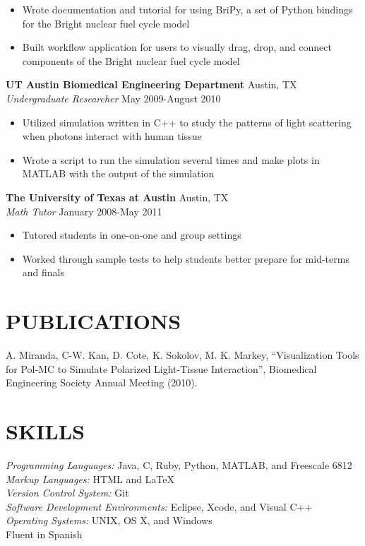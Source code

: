 \documentclass[line,margin]{res}
\begin{document}
\begin{resume}
\begin{itemize}
    \item Wrote documentation and tutorial for using BriPy, a set of Python
    bindings for the Bright nuclear fuel cycle model
    \item Built workflow application for users to visually drag, drop, and 
    connect components of the Bright nuclear fuel cycle model
  \end{itemize}
  {\bf UT Austin Biomedical Engineering Department} \hfill Austin, TX \\
  \emph{Undergraduate Researcher} \hfill May 2009-August 2010
  \begin{itemize} \itemsep -2pt
    \item Utilized simulation written in C++ to study the patterns of light 
    scattering when photons interact with human tissue
    \item Wrote a script to run the simulation several times and make plots in 
    MATLAB with the output of the simulation
  \end{itemize}
  {\bf The University of Texas at Austin} \hfill Austin, TX \\
  \emph{Math Tutor} \hfill January 2008-May 2011
  \begin{itemize} \itemsep -2pt
    \item Tutored students in one-on-one and group settings
    \item Worked through sample tests to help students better prepare for 
    mid-terms and finals
  \end{itemize}
 
\section{PUBLICATIONS} 
  A. Miranda, C-W. Kan, D. Cote, K. Sokolov, M. K. Markey, ``Visualization 
  Tools for Pol-MC to Simulate Polarized Light-Tissue Interaction'', 
  Biomedical Engineering Society Annual Meeting (2010).

\section{SKILLS}
  \emph{Programming Languages:} Java, C, Ruby, Python, MATLAB, and Freescale 
  6812 \\
  \emph{Markup Languages:} HTML and \LaTeX \\
  \emph{Version Control System:} Git \\
  \emph{Software Development Environments:} Eclipse, Xcode, and Visual C++ \\
  \emph{Operating Systems:} UNIX, OS X, and Windows \\
  Fluent in Spanish

\end{resume}
\end{document}
